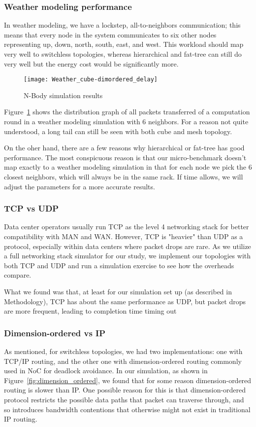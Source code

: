 \subsubsection{Weather modeling performance}
In weather modeling, we have a lockstep, all-to-neighbors communication; this means that every node in the system communicates to six other nodes representing up, down, north, south, east, and west. This workload should map very well to switchless topologies, whereas hierarchical and fat-tree can still do very well but the energy cost would be significantly more.

\captionsetup[subfloat]{captionskip=-0.003in}
\begin{figure}
    \centering
        \texttt{[image: Weather\_cube-dimordered\_delay]}
        \label{fig:weather_packetdelay}
    \caption{N-Body simulation results}
\end{figure}

Figure~\ref{fig:weather_packetdelay} shows the distribution graph of all packets transferred of a computation round in a weather modeling simulation with 6 neighbors. For a reason not quite understood, a long tail can still be seen with both cube and mesh topology.

On the oher hand, there are a few reasons why hierarchical or fat-tree has good performance. The most conspicuous reason is that our micro-benchmark doesn't map exactly to a weather modeling simulation in that for each node we pick the 6 closest neighbors, which will always be in the same rack. If time allows, we will adjust the parameters for a more accurate results.

\subsubsection{TCP vs UDP}
Data center operators usually run TCP as the level 4 networking stack for better compatibility with MAN and WAN. However, TCP is "heavier" than UDP as a protocol, especially within data centers where packet drops are rare. As we utilize a full networking stack simulator for our study, we implement our topologies with both TCP and UDP and run a simulation exercise to see how the overheads compare.

What we found was that, at least for our simulation set up (as described in Methodology), TCP has about the same performance as UDP, but packet drops are more frequent, leading to completion time timing out

\subsubsection{Dimension-ordered vs IP}
As mentioned, for switchless topologies, we had two implementations: one with TCP/IP routing, and the other one with dimension-ordered routing commonly used in NoC for deadlock avoidance. In our simulation, as shown in Figure~\ref{fig:dimension_ordered}, we found that for some reason dimension-ordered routing is slower than IP. One possible reason for this is that dimension-ordered protocol restricts the possible data paths that packet can traverse through, and so introduces bandwidth contentions that otherwise might not exist in traditional IP routing.


